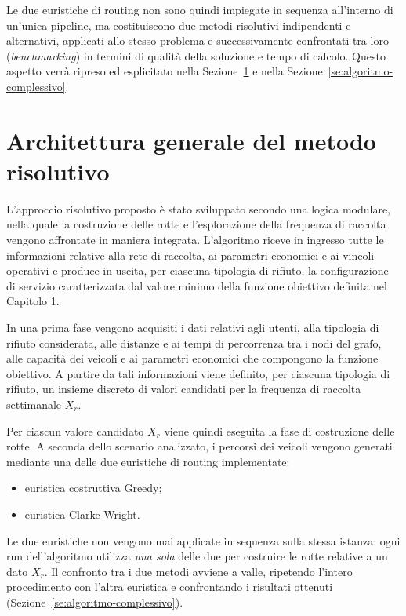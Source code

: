 Le due euristiche di routing non sono quindi impiegate in sequenza all'interno di un'unica pipeline, ma costituiscono due metodi risolutivi indipendenti e alternativi, applicati allo stesso problema e successivamente confrontati tra loro (\emph{benchmarking}) in termini di qualità della soluzione e tempo di calcolo. Questo aspetto verrà ripreso ed esplicitato nella Sezione~\ref{se:architettura} e nella Sezione~\ref{se:algoritmo-complessivo}.

\section{Architettura generale del metodo risolutivo}\label{se:architettura}

L'approccio risolutivo proposto è stato sviluppato secondo una logica modulare, nella quale la costruzione delle rotte e l'esplorazione della frequenza di raccolta vengono affrontate in maniera integrata. L'algoritmo riceve in ingresso tutte le informazioni relative alla rete di raccolta, ai parametri economici e ai vincoli operativi e produce in uscita, per ciascuna tipologia di rifiuto, la configurazione di servizio caratterizzata dal valore minimo della funzione obiettivo definita nel Capitolo 1.

In una prima fase vengono acquisiti i dati relativi agli utenti, alla tipologia di rifiuto considerata, alle distanze e ai tempi di percorrenza tra i nodi del grafo, alle capacità dei veicoli e ai parametri economici che compongono la funzione obiettivo. A partire da tali informazioni viene definito, per ciascuna tipologia di rifiuto, un insieme discreto di valori candidati per la frequenza di raccolta settimanale $X_r$.

Per ciascun valore candidato $X_r$ viene quindi eseguita la fase di costruzione delle rotte. A seconda dello scenario analizzato, i percorsi dei veicoli vengono generati mediante una delle due euristiche di routing implementate:

\begin{itemize}
	\item euristica costruttiva Greedy;
	\item euristica Clarke-Wright.
\end{itemize}

\noindent
Le due euristiche non vengono mai applicate in sequenza sulla stessa istanza: ogni run dell'algoritmo utilizza \emph{una sola} delle due per costruire le rotte relative a un dato $X_r$. Il confronto tra i due metodi avviene a valle, ripetendo l'intero procedimento con l'altra euristica e confrontando i risultati ottenuti (Sezione~\ref{se:algoritmo-complessivo}).


